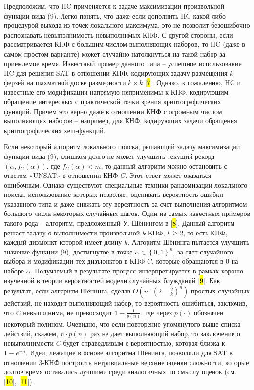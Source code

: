 Предположим, что HC применяется к задаче максимизации произвольной функции вида (9). Легко понять, что даже если дополнить HC какой-либо процедурой выхода из точек локального максимума, это не позволит безошибочно распознавать невыполнимость невыполнимых КНФ. С другой стороны, если рассматривается КНФ с большим числом выполняющих наборов, то HC (даже в самом простом варианте) может случайно натолкнуться на такой набор за приемлемое время. Известный пример данного типа -- успешное использование HC для решения SAT в отношении КНФ, кодирующих задачу размещения $k$ ферзей на шахматной доске размерности $k \times k$ {[}\hl{7}{]}. Однако, к сожалению, HC и известные его модификации напрямую неприменимы к КНФ, кодирующим обращение интересных с практической точки зрения криптографических функций. Причем это верно даже в отношении КНФ с огромным числом выполняющих наборов -- например, для КНФ, кодирующих задачи обращения криптографических хеш-функций.

Если некоторый алгоритм локального поиска, решающий задачу максимизации функции вида (9), слишком долго не может улучшить текущий рекорд $\left( \alpha,f_{C}(\alpha) \right)$, где $f_{C}(\alpha) < m$, то данный алгоритм можно остановить с ответом «UNSAT» в отношении КНФ $C$. Этот ответ может оказаться ошибочным. Однако существуют специальные техники рандомизации локального поиска, использование которых позволяет оценивать вероятность ошибки указанного типа и даже снижать эту вероятность за счет выполнения алгоритмом большого числа некоторых случайных шагов. Один из самых известных примеров такого рода -- алгоритм, предложенный У. Шёнингом в {[}\hl{8}{]}. Данный алгоритм решает задачу о выполнимости произвольной $k$-КНФ, $k \geq 2$, то есть КНФ, каждый дизъюнкт которой имеет длину $k$. Алгоритм Шёнинга пытается улучшить значение функции (9), достигнутое в точке $\alpha \in \left\{ 0,1 \right\}^{n}$, за счет случайного выбора и модификации тех дизъюнктов в КНФ $C$, которые обращаются в 0 на наборе $\alpha$. Получаемый в результате процесс интерпретируется в рамках хорошо изученной в теории вероятностей модели случайных блужданий {[}\hl{9}{]}. Как результат, если алгоритм Шёнинга, сделав $O\left( n \cdot \left( 2 - \frac{2}{k} \right)^{n} \right)$ простых случайных действий, не находит выполняющий набор, то вероятность ошибиться, заключив, что $C$ невыполнима, не превосходит $1 - \frac{1}{p(n)}$, где через $p( \cdot )$ обозначен некоторый полином. Очевидно, что если повторение упомянутого выше списка действий, скажем, $n \cdot p(n)$ раз не дает выполняющий набор, то заключение о невыполнимости $C$ будет справедливым с вероятностью, которая близка к $1 - e^{- n}.$ Идеи, лежащие в основе алгоритма Шёнинга, позволили для SAT в отношении 3-КНФ построить нетривиальные верхние оценки сложности, которые долгое время оставались лучшими среди аналогичных по смыслу оценок (см. {[}\hl{10}{]}, {[}\hl{11}{]}).

